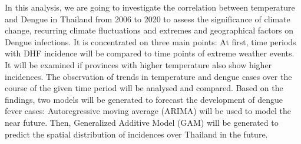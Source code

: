 In this analysis, we are going to investigate the correlation between temperature and Dengue in Thailand from 2006 to 2020 to assess the significance of climate change, recurring climate fluctuations and extremes and geographical factors on Dengue infections.
It is concentrated on three main points: At first, time periods with DHF incidence will be compared to time points of extreme weather events. It will be examined if provinces with higher temperature also show higher incidences. The observation of trends in temperature and dengue cases over the course of the given time period will be analysed and compared. 
Based on the findings, two models will be generated to forecast the development of dengue fever cases: Autoregressive moving average (ARIMA) will be used to model the near future. Then, Generalized Additive Model (GAM) will be generated to predict the spatial distribution of incidences over Thailand in the future. 


